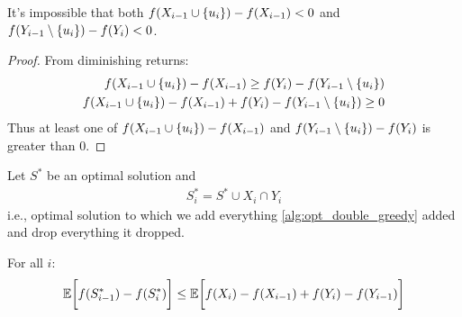 \begin{prop}
	It's impossible that both $f(X_{i-1} \cup \qty{u_i})-f(X_{i-1}) <0$ and  $f(Y_{i-1} \setminus \qty{u_i}) - f(Y_i)<0$.
	\begin{proof}
		From diminishing returns:
		\begin{align}
		f(X_{i-1} \cup \qty{u_i})-f(X_{i-1}) \geq f(Y_i) - f(Y_{i-1} \setminus \qty{u_i})  \\
		f(X_{i-1} \cup \qty{u_i})-f(X_{i-1}) + f(Y_i) - f(Y_{i-1} \setminus \qty{u_i}) \geq 0
		\end{align}
		Thus at least one of  $f(X_{i-1} \cup \qty{u_i})-f(X_{i-1}) $ and  $f(Y_{i-1} \setminus \qty{u_i}) - f(Y_i)$ is greater than $0$.
	\end{proof}
\end{prop}


\begin{lemma}
	Let $S^*$ be an optimal solution and 
	\begin{align}
	S^*_i = S^* \cup X_i \cap Y_i
	\end{align}
	i.e., optimal solution to which we add everything \cref{alg:opt_double_greedy} added and drop everything it dropped.
	
	For all $i$:
	\begin{align}
	\mathbb{E} \qty\bigg[f(S^*_{i-1}) - f(S^*_i)] \leq \mathbb{E} \qty\bigg[f(X_i) - f(X_{i-1})+f(Y_i) - f(Y_{i-1}) ]
	\end{align}
\end{lemma}


